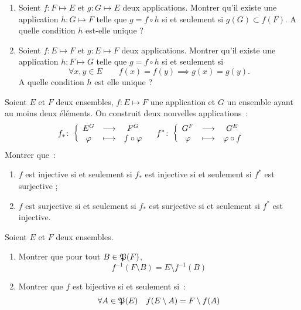 \begin{exercice}
    \begin{enumerate}
        \item Soient \(f : F \longmapsto E\) et \(g : G \longmapsto E\) deux applications. Montrer qu'il existe une application \(h : G \longmapsto F\) telle que \(g = f \circ h\) si et seulement si \(g(G) \subset f(F)\). A quelle condition \(h\) est-elle unique ?
        \item Soient \(f : E \longmapsto F\) et \(g : E \longmapsto F\) deux applications. Montrer qu'il existe une application \(h : F \longmapsto G\) telle que \(g = f \circ h\) si et seulement si 
            \begin{equation}
                \forall x,y \in E \qquad f(x)=f(y) \implies g(x)=g(y).
            \end{equation}
            A quelle condition \(h\) est elle unique ?
    \end{enumerate}
\end{exercice}
\begin{exercice}
    Soient \(E\) et \(F\) deux ensembles, \(f : E \longmapsto F\) une application et \(G\) un ensemble ayant au moins deux éléments. On construit deux nouvelles applications~:
    \begin{equation}
        f_{*}\colon \left\{\begin{array}{ccc} E^G & \longrightarrow &F^G\\ \varphi & \longmapsto & f \circ \varphi \end{array} \right. \quad f^{*}\colon \left\{\begin{array}{ccc} G^F & \longrightarrow &G^E\\ \varphi & \longmapsto & \varphi \circ f \end{array} \right.
    \end{equation}
    Montrer que~:
    \begin{enumerate}
        \item \(f\) est injective si et seulement si \(f_{*}\) est injective si et seulement si \(f^{*}\) est surjective ;
        \item \(f\) est surjective si et seulement si \(f_{*}\) est surjective si et seulement si \(f^{*}\) est injective.
    \end{enumerate}
\end{exercice}
\begin{exercice}
    Soient \(E\) et \(F\) deux ensembles.
    \begin{enumerate}
        \item Montrer que pour tout \(B \in \mathfrak{P}(F)\),
            \begin{equation}
                f^{-1}(F\setminus B) = E \setminus f^{-1}(B)
            \end{equation}
        \item Montrer que \(f\) est bijective si et seulement si~:
            \begin{equation}
                \forall A \in \mathfrak{P}(E) \quad f(E\setminus A) = F\setminus f(A)
            \end{equation}
    \end{enumerate}
\end{exercice}
